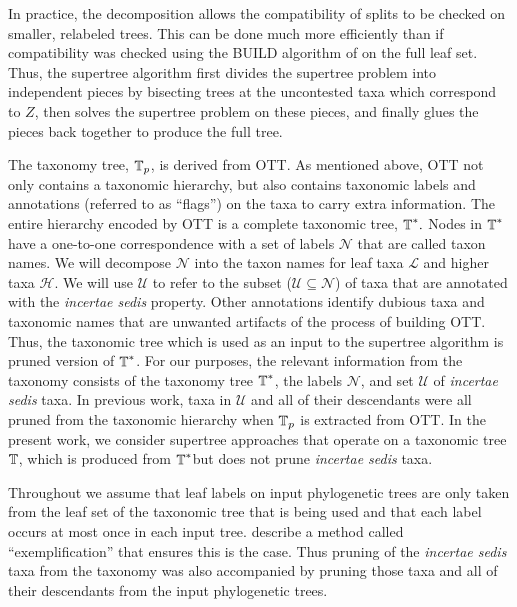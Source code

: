 \documentclass[english]{article}
\begin{document}
In practice, the decomposition allows the compatibility of splits to be checked
on smaller, relabeled trees. This can be done much more efficiently than if
compatibility was checked using the BUILD algorithm of \citet{AhoSSU1981} on the
full leaf set. Thus, the supertree algorithm first divides the supertree problem
into independent pieces by bisecting trees at the uncontested taxa which
correspond to $Z$, then solves the supertree problem on these pieces, and finally
glues the pieces back together to produce the full tree.

The taxonomy tree, $\mbox{\ensuremath{\mathbb{T}}}_{p}$, is derived from OTT. As mentioned above, OTT not only
contains a taxonomic hierarchy, but also contains taxonomic labels and
annotations (referred to as ``flags'') on the taxa to carry extra information.
The entire hierarchy encoded by OTT is a complete taxonomic tree, $\mbox{\ensuremath{\mathbb{T}}}^{\ast}.$ Nodes in
$\mbox{\ensuremath{\mathbb{T}}}^{\ast}$ have a one-to-one correspondence with a set of labels $\mathcal{N}$ that are called
taxon names. We will decompose $\mathcal{N}$ into the taxon names for leaf taxa $\mathcal{L}$ and
higher taxa $\mathcal{H}$. We will use $\mathcal{U}$ to refer to the subset ($\mathcal{U}\subseteq\mathcal{N}$) of taxa that are
annotated with the \emph{incertae sedis }property. Other annotations identify
dubious taxa and taxonomic names that are unwanted artifacts of the process of
building OTT. Thus, the taxonomic tree which is used as an input to the
supertree algorithm is pruned version of $\mbox{\ensuremath{\mathbb{T}}}^{\ast}$. For our purposes, the relevant
information from the taxonomy consists of the taxonomy tree $\mbox{\ensuremath{\mathbb{T}}}^{\ast}$, the labels $\mathcal{N}$,
and set $\mathcal{U}$ of \emph{incertae sedis} taxa. In previous work, taxa in $\mathcal{U}$ and all
of their descendants were all pruned from the taxonomic hierarchy when $\mbox{\ensuremath{\mathbb{T}}}_{p}$ is
extracted from OTT. In the present work, we consider supertree approaches that
operate on a taxonomic tree $\mbox{\ensuremath{\mathbb{T}}}$, which is produced from $\mbox{\ensuremath{\mathbb{T}}}^{\ast}$but does not prune
\emph{incertae sedis} taxa.

Throughout we assume that leaf labels on input phylogenetic trees are only taken
from the leaf set of the taxonomic tree that is being used and that each label
occurs at most once in each input tree. \citet{redelings2017supertree} describe
a method called ``exemplification'' that ensures this is the case. Thus pruning
of the \emph{incertae sedis} taxa from the taxonomy was also accompanied by
pruning those taxa and all of their descendants from the input phylogenetic
trees.
\end{document}
